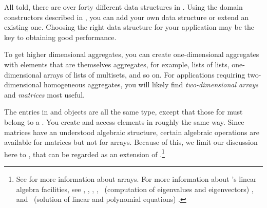 {{{{{{{{All told, there are over forty different data structures in
\Language{}.
Using the domain constructors described in , you
can add your own data structure or extend an existing one.
Choosing the right data structure for your application may be the key
to obtaining good performance.

%

To get higher dimensional aggregates, you can create one-dimensional
aggregates with elements that are themselves
aggregates, for example, lists of lists, one-dimensional arrays of
lists of multisets, and so on.
For applications requiring two-dimensional homogeneous aggregates,
you will likely find {\it two-dimensional arrays}
and {\it matrices} most useful.

The entries in  and
 objects
are all the same type, except that those for
 must belong to a .
You create and access elements in roughly the same way.
Since matrices have an understood algebraic structure, certain algebraic
operations are available for matrices but not for arrays.
Because of this, we limit our discussion here to
, that can be regarded as an extension of
.\footnote{See
 for more information about arrays.
For more information about \Language{}'s linear algebra
facilities, see , ,
, ,
%
\ (computation of eigenvalues and eigenvectors)
, and
%
\ (solution of linear and polynomial equations)
.}

}}}}}}}}
